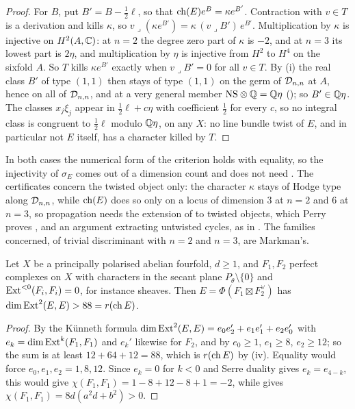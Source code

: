 \begin{proof}
For $B$, put $B'=B-\frac12\ell$, so that $\operatorname{ch}(E)e^{B}=\kappa e^{B'}$.
Contraction with $v\in T$ is a derivation and kills $\kappa$, so
$v\lrcorner(\kappa e^{B'})=\kappa\,(v\lrcorner B')\,e^{B'}$. Multiplication by
$\kappa$ is injective on $H^{2}(A,\mathbb{C})$: at $n=2$ the degree zero part of
$\kappa$ is $-2$, and at $n=3$ its lowest part is $2\eta$, and multiplication
by $\eta$ is injective from $H^{2}$ to $H^{4}$ on the sixfold $A$. So $T$ kills
$\kappa e^{B'}$ exactly when $v\lrcorner B'=0$ for all $v\in T$. By
(i) the real class $B'$ of type $(1,1)$ then stays of
type $(1,1)$ on the germ of $\mathcal{D}_{n,n}$ at $A$, hence on all of $\mathcal{D}_{n,n}$, and
at a very general member $\mathrm{NS}\otimes\mathbb{Q}=\mathbb{Q}\eta$ (); so
$B'\in\mathbb{Q}\eta$. The classes $x_{j}\xi_{j}$ appear in $\frac12\ell+c\eta$ with
coefficient $\frac12$ for every $c$, so no integral class is congruent to
$\frac12\ell$ modulo $\mathbb{Q}\eta$, on any $X$: no line bundle twist of $E$, and in
particular not $E$ itself, has a character killed by $T$.
\end{proof}

In both cases the numerical form of the criterion holds with equality, so the
injectivity of $\sigma_{E}$ comes out of a dimension count and does not need
\cite[Question 11.4]{Mar25b}. The certificates concern the twisted object
only: the character $\kappa$ stays of Hodge type along $\mathcal{D}_{n,n}$, while
$\operatorname{ch}(E)$ does
so only on a locus of dimension $3$ at $n=2$ and $6$ at $n=3$, so propagation
needs the extension of  to twisted objects, which Perry proves
\cite{Per26}, and an argument extracting untwisted cycles, as in
\cite[Section 2]{Mar25b}. The families concerned, of trivial discriminant with
$n=2$ and $n=3$, are Markman's.

\begin{proposition}[No Orlov product at $n=4$]\label{prop:orlovfour}
Let $X$ be a principally polarised abelian fourfold, $d\ge1$, and
$F_{1},F_{2}$ perfect complexes on $X$ with characters in the secant plane
$P_{\theta}\setminus\{0\}$ and $\operatorname{Ext}^{<0}(F_{i},F_{i})=0$, for instance
sheaves. Then $E=\Phi(F_{1}\boxtimes F_{2}^{\vee})$ has
$\dim\operatorname{Ext}^{2}(E,E)>88=r(\operatorname{ch} E)$.
\end{proposition}

\begin{proof}
By the K\"unneth formula $\dim\operatorname{Ext}^{2}(E,E)=e_{0}e_{2}'+e_{1}e_{1}'+e_{2}e_{0}'$
with $e_{k}=\dim\operatorname{Ext}^{k}(F_{1},F_{1})$ and $e_{k}'$ likewise for $F_{2}$, and by
 $e_{0}\ge1$, $e_{1}\ge8$, $e_{2}\ge12$; so the sum is
at least $12+64+12=88$, which is $r(\operatorname{ch} E)$ by (iv). Equality
would force $e_{0},e_{1},e_{2}=1,8,12$. Since $e_{k}=0$ for $k<0$ and Serre
duality gives $e_{k}=e_{4-k}$, this would give
$\chi(F_{1},F_{1})=1-8+12-8+1=-2$, while  gives
$\chi(F_{1},F_{1})=8d(a^{2}d+b^{2})>0$.
\end{proof}

